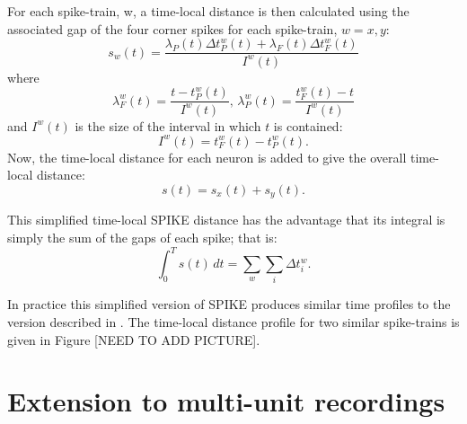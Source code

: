 For each spike-train, w, a time-local distance is then calculated using the associated gap of the four corner spikes for each spike-train, $w=x,y$:
\begin{equation}
s_w(t) = \frac{\lambda_P(t) \Delta t_P^w(t) + \lambda_F(t)\Delta t_F^w(t)}{I^w(t)}
\end{equation}
where
\begin{equation}
\lambda_F^w(t) = \frac{t- t_P^w(t)}{I^w(t)}, \, \lambda_P^w(t) = \frac{ t_F^w(t) - t}{I^w(t)}
\end{equation}
and $I^w(t)$ is the size of the interval in which $t$ is contained:
\begin{equation}
I^w(t) = t_F^w(t) - t_P^w(t).
\end{equation}
Now, the time-local distance for each neuron is added to give the overall time-local distance:
\begin{equation}
s(t) = s_x(t) + s_y(t).
\end{equation}

This simplified time-local SPIKE distance has the advantage that its integral is simply the sum of the gaps of each spike; that is:
\begin{equation}
\int_0^T s(t)\, dt = \sum_w \sum_i \Delta t_i^w.
\end{equation}

In practice this simplified version of SPIKE produces similar time profiles to the version described in \cite{Kreuzetal2010}. The time-local distance profile for two similar spike-trains is given in Figure [NEED TO ADD PICTURE].

\section{Extension to multi-unit recordings}